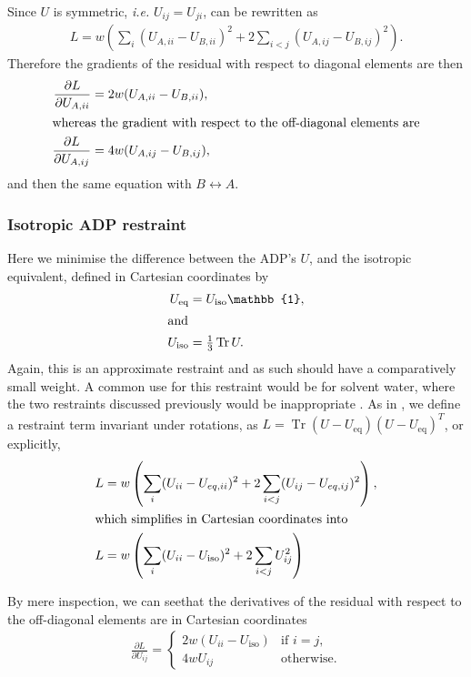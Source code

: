 \documentclass[pdf]{iucr}
\newcommand{\mat}[1]{#1}
\newcommand{\identity}{\mathbb{1}}
\newcommand{\tr}{\operatorname{Tr}}
\newcommand{\partialder}[2]{\frac{\partial #1}{\partial #2}}
\begin{document}
Since $\mat{U}$ is symmetric, \emph{i.e.} $U_{ij} = U_{ji}$,  can be rewritten as
\begin{align}
L = w \left( \sum_i (U_{A,ii} - U_{B,ii})^2 + 2 \sum_{i < j} (U_{A,ij} - U_{B,ij})^2 \right) .
\end{align}
Therefore the gradients of the residual with respect to diagonal elements are then
\begin{align}
\partialder{L}{U_{A,ii}} &= 2w(U_{A,ii} - U_{B,ii}),\\
\shortintertext{whereas the gradient with respect to the off-diagonal elements are}
\partialder{L}{U_{A,ij}} &=  4w(U_{A,ij} - U_{B,ij}),
\end{align}
and then the same equation with $B \leftrightarrow A$.

\subsubsection{Isotropic ADP restraint}
Here we minimise the difference between the ADP's $\mat{U}$, and the isotropic equivalent, defined in Cartesian coordinates by
\begin{align}
\mat{U}_\text{eq} &= U_\text{iso}\identity, \\
\shortintertext{and}
U_\text{iso} &= \tfrac{1}{3} \tr \mat{U}.
\end{align}
Again, this is an approximate restraint and as such should have a comparatively small weight. A common use for this restraint would be for solvent water, where the two restraints discussed previously would be inappropriate . As in , we define a restraint term invariant under rotations, as $L = \tr (U-U_\text{eq})(U-U_\text{eq})^T$, or explicitly,
\begin{align}
\label{eqn:ADP:restraints:isotropic}
L &= w \left( \sum_i (U_{ii} - U_{eq,ii})^2 + 2 \sum_{i<j} (U_{ij}-U_{eq,ij})^2 \right),\\
\shortintertext{which simplifies in Cartesian coordinates into}
L &= w \left( \sum_i (U_{ii} - U_\text{iso})^2 + 2 \sum_{i<j} U_{ij}^2 \right)
\end{align}

By mere inspection, we can seethat the derivatives of the residual with respect to the off-diagonal elements are in Cartesian coordinates
\begin{align}
\partialder{L}{U_{ij}} = \begin{cases}
 2 w (U_{ii} - U_\text{iso}) & \text{if $i=j$,}\\
 4 w U_{ij} & \text{otherwise}.
 \end{cases}
\end{align}
\end{document}

